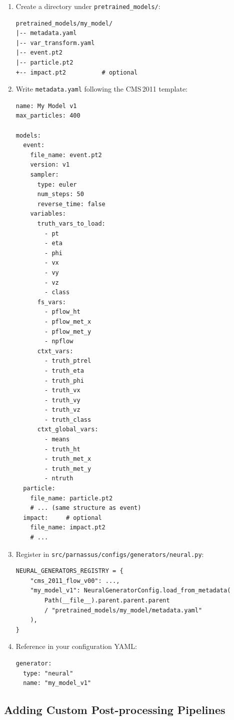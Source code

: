 \documentclass[11pt,a4paper]{article}
\begin{document}
\begin{enumerate}
  \item Create a directory under \texttt{pretrained\_models/}:
\begin{lstlisting}[style=bash]
pretrained_models/my_model/
|-- metadata.yaml
|-- var_transform.yaml
|-- event.pt2
|-- particle.pt2
+-- impact.pt2          # optional
\end{lstlisting}

  \item Write \texttt{metadata.yaml} following the CMS\,2011 template:
\begin{lstlisting}[style=yaml,caption={Example metadata for a custom model.}]
name: My Model v1
max_particles: 400

models:
  event:
    file_name: event.pt2
    version: v1
    sampler:
      type: euler
      num_steps: 50
      reverse_time: false
    variables:
      truth_vars_to_load:
        - pt
        - eta
        - phi
        - vx
        - vy
        - vz
        - class
      fs_vars:
        - pflow_ht
        - pflow_met_x
        - pflow_met_y
        - npflow
      ctxt_vars:
        - truth_ptrel
        - truth_eta
        - truth_phi
        - truth_vx
        - truth_vy
        - truth_vz
        - truth_class
      ctxt_global_vars:
        - means
        - truth_ht
        - truth_met_x
        - truth_met_y
        - ntruth
  particle:
    file_name: particle.pt2
    # ... (same structure as event)
  impact:     # optional
    file_name: impact.pt2
    # ...
\end{lstlisting}

  \item Register in \texttt{src/parnassus/configs/generators/neural.py}:
\begin{lstlisting}[style=python]
NEURAL_GENERATORS_REGISTRY = {
    "cms_2011_flow_v00": ...,
    "my_model_v1": NeuralGeneratorConfig.load_from_metadata(
        Path(__file__).parent.parent.parent
        / "pretrained_models/my_model/metadata.yaml"
    ),
}
\end{lstlisting}

  \item Reference in your configuration YAML:
\begin{lstlisting}[style=yaml]
generator:
  type: "neural"
  name: "my_model_v1"
\end{lstlisting}
\end{enumerate}

\subsection{Adding Custom Post-processing Pipelines}
\end{document}
